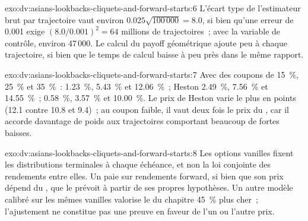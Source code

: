 \begin{solution}{exo:dv:asians-lookbacks-cliquets-and-forward-starts:6}
L'écart type de l'estimateur brut par trajectoire vaut environ $0.025\sqrt{100\,000}=8.0$, si bien qu'une erreur de 0.001 exige
$(8.0/0.001)^2=64$ millions de trajectoires~; avec la variable de contrôle, environ 47\,000. Le calcul du payoff géométrique ajoute peu à chaque trajectoire,
si bien que le temps de calcul baisse à peu près dans le même rapport.
\end{solution}

\begin{solution}{exo:dv:asians-lookbacks-cliquets-and-forward-starts:7}
Avec des coupons de 15~\%, 25~\% et 35~\%~:  1.23~\%, 5.43~\% et 12.06~\%~; Heston 2.49~\%, 7.56~\% et 14.55~\%~; 
0.58~\%, 3.57~\% et 10.00~\%. Le prix de Heston varie le plus en points (12.1 contre 10.8 et 9.4)~; au coupon faible, il vaut deux fois le
prix du , car il accorde davantage de poids aux trajectoires comportant beaucoup de fortes baisses.
\end{solution}

\begin{solution}{exo:dv:asians-lookbacks-cliquets-and-forward-starts:8}
Les options vanilles fixent les distributions terminales à chaque échéance, et non la loi conjointe des rendements entre elles. Un  paie sur
rendements forward, si bien que son prix dépend du , que le  prévoit à partir de ses propres
hypothèses. Un autre modèle calibré sur les mêmes vanilles valorise le  du chapitre 45~\% plus cher~; l'ajustement ne constitue pas une preuve en faveur de
l'un ou l'autre prix.
\end{solution}

